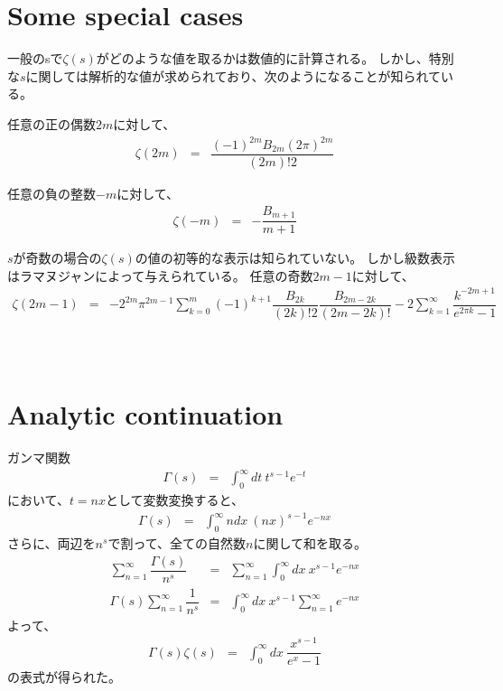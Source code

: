 \documentclass[uplatex,a4j,12pt,dvipdfmx]{jsarticle}
\begin{document}
\section{Some special cases}

一般のsで$\zeta(s)$がどのような値を取るかは数値的に計算される。
しかし、特別な$s$に関しては解析的な値が求められており、次のようになることが知られている。

任意の正の偶数$2m$に対して、
\begin{eqnarray}
	\zeta(2m)
	&=&
	\dfrac{(-1)^{2m} B_{2m} (2 \pi)^{2m} }{(2m)! 2}
\end{eqnarray}

任意の負の整数$-m$に対して、
\begin{eqnarray}
	\zeta(-m)
	&=&
	-
	\dfrac{B_{m+1}}{m+1}
\end{eqnarray}

$s$が奇数の場合の$\zeta(s)$の値の初等的な表示は知られていない。
しかし級数表示はラマヌジャンによって与えられている。
任意の奇数$2m-1$に対して、
\begin{eqnarray}
	\zeta(2m-1)
	&=&
	-
	2^{2m} \pi^{2m-1}
	\sum_{k=0}^{m}
	(-1)^{k+1}
	\dfrac{B_{2k}}{(2k)!2}
	\dfrac{B_{2m-2k}}{(2m-2k)!}
	-
	2
	\sum_{k=1}^{\infty}
	\dfrac{ k^{-2m+1} }{ e^{2 \pi k} - 1 }
\end{eqnarray}

${}$

${}$

${}$

\section{Analytic continuation}

ガンマ関数
\begin{eqnarray}
	\Gamma(s)
	&=&
	\int^{\infty}_{0}
	\!\! dt
	\ \! t^{s-1} e^{-t}
\end{eqnarray}
において、$t=nx$として変数変換すると、
\begin{eqnarray}
	\Gamma(s)
	&=&
	\int^{\infty}_{0}
	\!\! ndx
	\ \! (nx)^{s-1} e^{-nx}
	\label{eqn:1302120225hayonena}
\end{eqnarray}
さらに、両辺を$n^{s}$で割って、全ての自然数$n$に関して和を取る。
\begin{eqnarray}
	\sum_{n=1}^{\infty}
	\dfrac{ \Gamma(s) }{ n^{s} }
	&=&
	\sum_{n=1}^{\infty}
	\int^{\infty}_{0}
	\!\! dx
	\ \! x^{s-1} e^{-nx}
	\nonumber \\
	\Gamma(s)
	\sum_{n=1}^{\infty}
	\dfrac{ 1 }{ n^{s} }
	&=&
	\int^{\infty}_{0}
	\!\! dx
	\ \! x^{s-1}
	\sum_{n=1}^{\infty}
	e^{-nx}
\end{eqnarray}
よって、
\begin{eqnarray}
	\Gamma(s)
	\zeta(s)
	&=&
	\int^{\infty}_{0}
	\!\! dx
	\ \!
	\dfrac{x^{s-1}}{e^{x} - 1}
	\label{eqn:1302120248nerana}
\end{eqnarray}
の表式が得られた。
\end{document}
